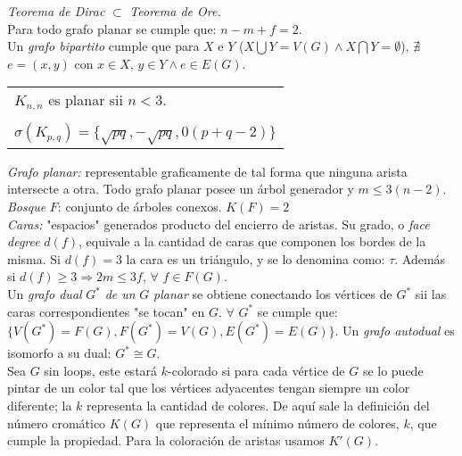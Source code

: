 \documentclass[titlepage,a4paper,12pt,twoside]{article}
\begin{document}
\textit{Teorema de Dirac} $ \subset $ \textit{Teorema de Ore.}\\

Para todo grafo planar se cumple que: $n - m + f = 2$.\\

Un \textit{grafo bipartito} cumple que para $X$ e $Y$ ($X \bigcup Y = V(G) \wedge X \bigcap Y = \emptyset$), $\nexists $ $e = (x,y)$ con $x \in X$, $y \in Y \wedge e \in E(G)$.

\begin{table}[htbp]
\centering
\begin{tabular}{l}
$K_{n,n}$ es planar sii $n < 3$.\\
$ $\\
$ \sigma(K_{p,q}) = \{\sqrt{pq},-\sqrt{pq},0(p+q-2)\}$\\
\end{tabular}
\label{tabla}
\end{table}

\textit{Grafo planar:} representable graficamente de tal forma que ninguna arista intersecte a otra. Todo grafo planar posee un árbol generador y $m \leqslant 3(n-2)$.\\

\textit{Bosque} $F$: conjunto de árboles conexos. $K(F) = 2$\\

\textit{Caras:} "$ $espacios" generados producto del encierro de aristas. Su grado, o \textit{face degree} $d(f)$, equivale a la cantidad de caras que componen los bordes de la misma. Si $d(f) = 3$ la cara es un triángulo, y se lo denomina como: $\tau$. Además si $d(f) \geqslant 3 \Rightarrow 2m \leqslant 3f$, $\forall $ $ f \in F(G)$.\\

Un \textit{grafo dual} $G^*$ \textit{de un} $G$ \textit{planar} se obtiene conectando los vértices de $G^*$ sii las caras correspondientes "se tocan"$ $ en $G$. $\forall $ $ G^* $ se cumple que: $ \{V(G^*) = F(G), F(G^*) = V(G) , E(G^*) = E(G)\}$. Un \textit{grafo autodual} es isomorfo a su dual: $G^* \cong G$.\\

Sea $G$ sin loops, este estará $k$-colorado si para cada vértice de $G$ se lo puede pintar de un color tal que los vértices adyacentes tengan siempre un color diferente; la $k$ representa la cantidad de colores. 
De aquí sale la definición del número cromático $K(G)$ que representa el mínimo número de colores, $k$, que cumple la propiedad. Para la coloración de aristas usamos $K'(G)$.\\
\end{document}
